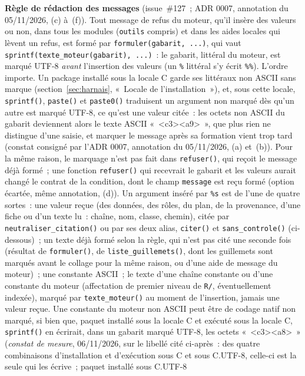 \documentclass[a4paper,11pt]{article}
\newcommand{\code}[1]{\texttt{\small #1}}
\begin{document}
\medskip
\noindent
\textbf{Règle de rédaction des messages} (issue~\#127~; ADR 0007,
annotation du 05/11/2026, (c) à~(f)). Tout message de refus du moteur, qu'il
insère des valeurs ou non, dans tous les modules (\code{outils} compris) et
dans les aides locales qui lèvent un refus, est formé par
\code{formuler(gabarit, ...)}, qui vaut
\code{sprintf(texte\_moteur(gabarit), ...)}~: le gabarit, littéral du
moteur, est marqué UTF-8 \emph{avant} l'insertion des valeurs (un \code{\%}
littéral s'y écrit \code{\%\%}). L'ordre importe. Un package installé sous
la locale C garde ses littéraux non ASCII sans marque
(section~\ref{sec:harnais}, «~Locale de l'installation~»), et, sous cette
locale, \code{sprintf()}, \code{paste()} et \code{paste0()} traduisent un
argument non marqué dès qu'un autre est marqué UTF-8, ce qu'est une valeur
citée~: les octets non ASCII du gabarit deviennent alors le texte ASCII
«~<c3><a9>~», que plus rien ne distingue d'une saisie, et marquer le
message après sa formation vient trop tard (constat consigné par l'ADR 0007,
annotation du 05/11/2026, (a) et~(b)). Pour la même raison, le marquage
n'est pas fait dans \code{refuser()}, qui reçoit le message déjà formé~; une
fonction \code{refuser()} qui recevrait le gabarit et les valeurs aurait changé le
contrat de la condition, dont le champ \code{message} est reçu formé
(option écartée, même annotation, (d)). Un argument inséré par \code{\%s}
est de l'une de quatre sortes~: une valeur reçue (des données, des rôles,
du plan, de la provenance, d'une fiche ou d'un texte lu~: chaîne, nom,
classe, chemin), citée par \code{neutraliser\_citation()} ou par ses deux
alias, \code{citer()} et \code{sans\_controle()} (ci-dessous)~; un texte
déjà formé selon la règle, qui n'est pas cité une seconde fois (résultat
de \code{formuler()}, de \code{liste\_guillemets()}, dont les guillemets
sont marqués avant le collage pour la même raison, ou d'une aide de
message du moteur)~; une constante ASCII~; le texte d'une chaîne
constante ou d'une constante du moteur (affectation de premier niveau de
\code{R/}, éventuellement indexée), marqué par \code{texte\_moteur()}
au moment de l'insertion, jamais une valeur reçue. Une constante du moteur
non ASCII peut être de codage natif non marqué, si bien que, paquet
installé sous la locale C et exécuté sous la locale C, \code{sprintf()} en
écrirait, dans un gabarit marqué UTF-8, les octets «~<c3><a8>~»
(\emph{constat de mesure}, 06/11/2026, sur le libellé cité ci-après~:
des quatre combinaisons d'installation et d'exécution sous C et sous
C.UTF-8, celle-ci est la seule qui les écrive~; paquet installé sous C.UTF-8
\end{document}
